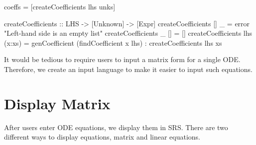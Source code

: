 \begin{haskell1}
coeffs = [createCoefficients lhs unks]

createCoefficients :: LHS -> [Unknown] -> [Expr]
createCoefficients [] _ = error "Left-hand side is an empty list"
createCoefficients _ [] = []
createCoefficients lhs (x:xs) = genCoefficient (findCoefficient x lhs) : createCoefficients lhs xs
\end{haskell1}

It would be tedious to require users to input a matrix form for a single ODE. Therefore, we create an input language to make it easier to input such equations.

\section{Display Matrix}
After users enter ODE equations, we display them in SRS. There are two different ways to display equations, matrix and linear equations.

